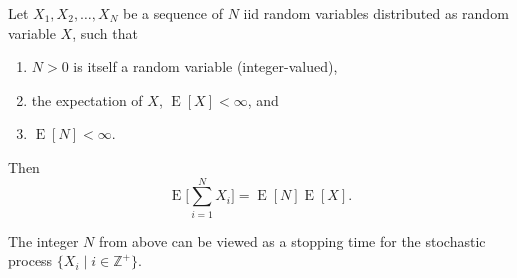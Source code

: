 \documentclass[12pt]{article}
\begin{document}
Let $X_1, X_2,\ldots, X_N$ be a sequence of $N$ iid random variables distributed as random variable $X$, such that 
\begin{enumerate}
\item $N>0$ is itself a random variable (integer-valued),
\item the expectation of $X$, $\operatorname{E}[X]<\infty$, and
\item $\operatorname{E}[N]<\infty$. 
\end{enumerate}
Then 
$$\operatorname{E}\Big[\sum_{i=1}^{N}X_i\Big]=\operatorname{E}[N]\operatorname{E}[X].$$
\par
The integer $N$ from above can be viewed as a stopping time for the stochastic process $\lbrace X_i \mid i\in\mathbb{Z}^+ \rbrace$.
\end{document}
